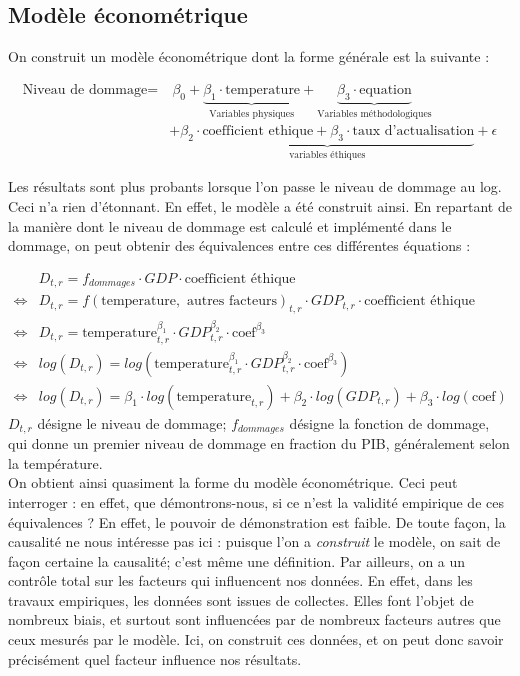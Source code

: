 \subsection{Modèle économétrique}

On construit un modèle économétrique dont la forme générale est la suivante : 


\begin{align}
\label{eq:modele}
    \text{Niveau de dommage} = & \ \beta_0  + \underbrace{\beta_1 \cdot \text{temperature}}_\text{Variables physiques}  + \underbrace{\beta_3 \cdot \text{equation}}_\text{Variables méthodologiques} \\
    & + \underbrace{ \beta_2 \cdot \text{coefficient ethique} + \beta_3 \cdot \text{taux d'actualisation}}_\text{variables éthiques}  + \epsilon
    \end{align}


Les résultats sont plus probants lorsque l'on passe le niveau de dommage au log. Ceci n'a rien d'étonnant. En effet, le modèle a été construit ainsi. En repartant de la manière dont le niveau de dommage est calculé et implémenté dans le dommage, on peut obtenir des équivalences entre ces différentes équations : 

\begin{align*}
& D_{t,r} = f_{dommages} \cdot GDP \cdot \text{coefficient éthique}\\
\iff & D_{t,r} = f(\text{temperature}, \text{ autres facteurs})_{t,r} \cdot GDP_{t,r} \cdot \text{coefficient éthique} \\
\iff  & D_{t,r} = \text{temperature}_{t,r}^{\beta_1} \cdot GDP_{t,r}^{\beta_2} \cdot \text{coef}^{\beta_3} \\
\iff & log(D_{t,r}) = log(\text{temperature}_{t,r}^{\beta_1} \cdot GDP_{t,r}^{\beta_2} \cdot \text{coef}^{\beta_3}) \\
\iff & log(D_{t,r}) = \beta_1 \cdot log(\text{temperature}_{t,r}) + \beta_2 \cdot log(GDP_{t,r}) + \beta_3 \cdot log(\text{coef})
\end{align*}
$D_{t,r}$ désigne le niveau de dommage; $f_{dommages}$ désigne la fonction de dommage, qui donne un premier niveau de dommage en fraction du PIB, généralement selon la température.  \\

On obtient ainsi quasiment la forme du modèle économétrique. Ceci peut interroger : en effet, que démontrons-nous, si ce n'est la validité empirique de ces équivalences ? En effet, le pouvoir de démonstration est faible. De toute façon, la causalité ne nous intéresse pas ici :  puisque l'on a \emph{construit} le modèle, on sait de façon certaine la causalité; c'est même une définition. Par ailleurs, on a un contrôle total sur les facteurs qui influencent nos données. En effet, dans les travaux empiriques, les données sont issues de collectes. Elles font l'objet de nombreux biais, et surtout sont influencées par de nombreux facteurs autres que ceux mesurés par le modèle. Ici, on construit ces données, et on peut donc savoir précisément quel facteur influence nos résultats. \\

